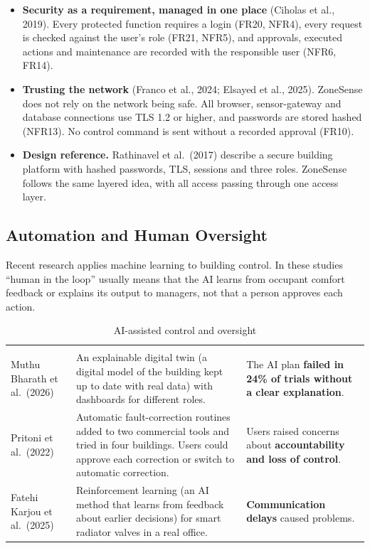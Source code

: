 \documentclass[11pt,a4paper]{article}
\begin{document}
\begin{itemize}
\item \textbf{Security as a requirement, managed in one place} (Ciholas et al., 2019). Every protected function requires a login (FR20, NFR4), every request is checked against the user's role (FR21, NFR5), and approvals, executed actions and maintenance are recorded with the responsible user (NFR6, FR14).
\item \textbf{Trusting the network} (Franco et al., 2024; Elsayed et al., 2025). ZoneSense does not rely on the network being safe. All browser, sensor-gateway and database connections use TLS 1.2 or higher, and passwords are stored hashed (NFR13). No control command is sent without a recorded approval (FR10).
\item \textbf{Design reference.} Rathinavel et al.\ (2017) describe a secure building platform with hashed passwords, TLS, sessions and three roles. ZoneSense follows the same layered idea, with all access passing through one access layer.
\end{itemize}

\subsection{Automation and Human Oversight}
Recent research applies machine learning to building control. In these studies ``human in the loop'' usually means that the AI learns from occupant comfort feedback or explains its output to managers, not that a person approves each action.

{\small\stripe
\begin{xltabular}{\linewidth}{|L{3.2cm}|L{5.4cm}|Y|}
\caption{AI-assisted control and oversight}\label{tab:ai}\\
\hline\headrow
{} &  & \\\hline
\endfirsthead
\hline\headrow
{} &  & \\\hline
\endhead
Muthu Bharath et al.\ (2026) & An explainable digital twin (a digital model of the building kept up to date with real data) with dashboards for different roles. & The AI plan \textbf{failed in 24\% of trials without a clear explanation}.\\\hline
Pritoni et al.\ (2022) & Automatic fault-correction routines added to two commercial tools and tried in four buildings. Users could approve each correction or switch to automatic correction. & Users raised concerns about \textbf{accountability and loss of control}.\\\hline
Fatehi Karjou et al.\ (2025) & Reinforcement learning (an AI method that learns from feedback about earlier decisions) for smart radiator valves in a real office. & \textbf{Communication delays} caused problems.\\\hline
\end{xltabular}}
\end{document}

